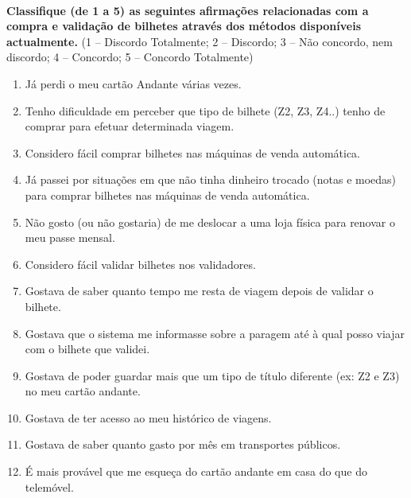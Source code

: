 ~\\\textbf{Classifique (de 1 a 5) as seguintes afirmações relacionadas com a compra e validação de bilhetes através dos métodos disponíveis actualmente.} (1 – Discordo Totalmente; 2 – Discordo; 3 – Não concordo, nem discordo; 4 – Concordo; 5 – Concordo Totalmente)
\begin{enumerate}
\item Já perdi o meu cartão Andante várias vezes.
\item Tenho dificuldade em perceber que tipo de bilhete (Z2, Z3, Z4..) tenho de comprar para efetuar determinada viagem.
\item Considero fácil comprar bilhetes nas máquinas de venda automática.
\item Já passei por situações em que não tinha dinheiro trocado (notas e moedas) para comprar bilhetes nas máquinas de venda automática.	
\item Não gosto (ou não gostaria) de me deslocar a uma loja física para renovar o meu passe mensal.	
\item Considero fácil validar bilhetes nos validadores.	
\item Gostava de saber quanto tempo me resta de viagem depois de validar o bilhete.	
\item Gostava que o sistema me informasse sobre a paragem até à qual posso viajar com o bilhete que validei.	
\item Gostava de poder guardar mais que um tipo de título diferente (ex: Z2 e Z3) no meu cartão andante.	
\item Gostava de ter acesso ao meu histórico de viagens.	
\item Gostava de saber quanto gasto por mês em transportes públicos.	
\item É mais provável que me esqueça do cartão andante em casa do que do telemóvel.
\end{enumerate}


